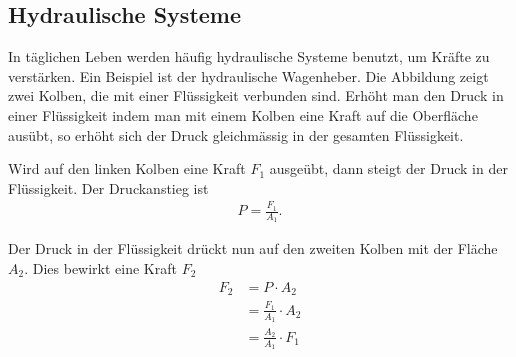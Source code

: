 \subsection*{Hydraulische Systeme}
In täglichen Leben werden häufig hydraulische Systeme benutzt, um Kräfte zu verstärken.
Ein Beispiel ist der hydraulische Wagenheber. Die Abbildung zeigt zwei Kolben, die
mit einer Flüssigkeit verbunden sind.
Erhöht man den Druck in einer Flüssigkeit indem man mit einem Kolben eine Kraft auf die
Oberfläche ausübt, so erhöht sich der Druck gleichmässig in der gesamten Flüssigkeit.

\begin{minipage}{0.5\textwidth}
\end{minipage}
\begin{minipage}{0.5\textwidth}
Wird auf den linken Kolben eine Kraft $F_1$ ausgeübt, dann steigt der Druck in der Flüssigkeit. Der Druckanstieg
ist
\begin{eqnarray*}
	P = \frac{F_1}{A_1}.
\end{eqnarray*}

Der Druck in der Flüssigkeit drückt nun auf den zweiten Kolben mit der Fläche $A_2$. Dies bewirkt eine Kraft $F_2$
\begin{align*}
	F_2 &= P\cdot A_2\\
	&=\frac{F_1}{A_1}\cdot A_2\\
	&=\frac{A_2}{A_1}\cdot F_1
\end{align*}

\end{minipage}
